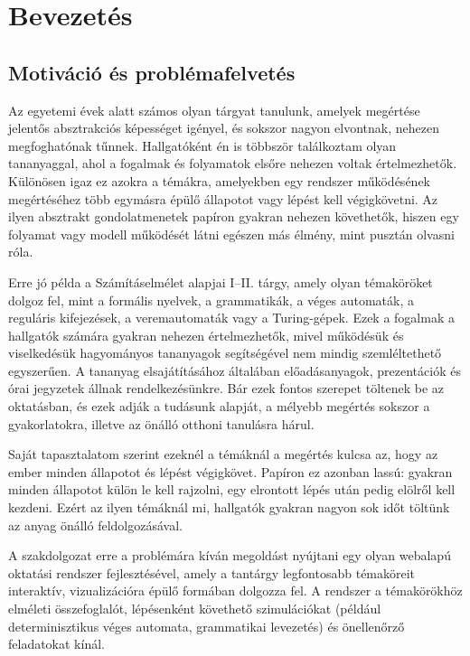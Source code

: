 \chapter{Bevezetés}
\label{ch:intro}

\section{Motiváció és problémafelvetés}

Az egyetemi évek alatt számos olyan tárgyat tanulunk, amelyek megértése
jelentős absztrakciós képességet igényel, és sokszor nagyon elvontnak,
nehezen megfoghatónak tűnnek. Hallgatóként én is többször találkoztam olyan
tananyaggal, ahol a fogalmak és folyamatok elsőre nehezen voltak értelmezhetők.
Különösen igaz ez azokra a témákra, amelyekben egy rendszer működésének megértéséhez
több egymásra épülő állapotot vagy lépést kell végigkövetni.
Az ilyen absztrakt gondolatmenetek papíron gyakran nehezen követhetők,
hiszen egy folyamat vagy modell működését látni egészen más élmény,
mint pusztán olvasni róla.

Erre jó példa a Számításelmélet alapjai I--II. tárgy,
amely olyan témaköröket dolgoz fel, mint a formális nyelvek,
a grammatikák, a véges automaták, a reguláris kifejezések,
a veremautomaták vagy a Turing-gépek.
Ezek a fogalmak a hallgatók számára gyakran nehezen értelmezhetők, mivel
működésük és viselkedésük hagyományos tananyagok segítségével nem mindig
szemléltethető egyszerűen.
A tananyag elsajátításához általában előadásanyagok, prezentációk és
órai jegyzetek állnak rendelkezésünkre. Bár ezek fontos szerepet
töltenek be az oktatásban, és ezek adják a tudásunk alapját, a
mélyebb megértés sokszor a gyakorlatokra, illetve az önálló otthoni
tanulásra hárul.

Saját tapasztalatom szerint ezeknél a témáknál a megértés kulcsa az, hogy az ember minden állapotot és lépést végigkövet. Papíron
ez azonban lassú: gyakran minden állapotot külön le kell rajzolni, egy
elrontott lépés után pedig elölről kell kezdeni. Ezért az ilyen
témáknál mi, hallgatók gyakran nagyon sok időt töltünk az anyag önálló
feldolgozásával.

A szakdolgozat erre a problémára kíván megoldást nyújtani egy olyan
webalapú oktatási rendszer fejlesztésével, amely a tantárgy
legfontosabb témaköreit interaktív, vizualizációra épülő formában
dolgozza fel. A rendszer a témakörökhöz elméleti összefoglalót,
lépésenként követhető szimulációkat (például determinisztikus véges
automata, grammatikai levezetés) és önellenőrző feladatokat kínál.

